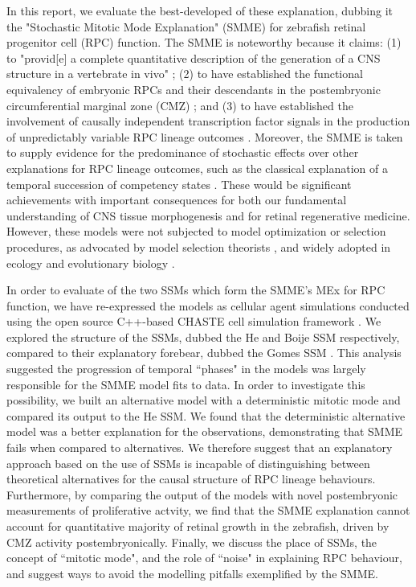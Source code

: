 In this report, we evaluate the best-developed of these explanation, dubbing it the "Stochastic Mitotic Mode Explanation" (SMME) for zebrafish retinal progenitor cell (RPC) function. The SMME is noteworthy because it claims: (1) to "provid[e] a complete quantitative description of the generation of a CNS structure in a vertebrate in vivo" \cite{He2012}; (2) to have established the functional equivalency of embryonic RPCs and their descendants in the postembryonic circumferential marginal zone (CMZ) \cite{Wan2016}; and (3) to have established the involvement of causally independent transcription factor signals in the production of unpredictably variable RPC lineage outcomes \cite{Boije2015}. Moreover, the SMME is taken to supply evidence for the predominance of stochastic effects over other explanations for RPC lineage outcomes, such as the classical explanation of a temporal succession of competency states \cite{Temple1986}. These would be significant achievements with important consequences for both our fundamental understanding of CNS tissue morphogenesis and for retinal regenerative medicine. However, these models were not subjected to model optimization or selection procedures, as advocated by model selection theorists \cite{Burnham2002}, and widely adopted in ecology and evolutionary biology \cite{Johnson2004}.

In order to evaluate of the two SSMs which form the SMME's MEx for RPC function, we have re-expressed the models as cellular agent simulations conducted using the open source C++-based CHASTE cell simulation framework \cite{Mirams2013}. We explored the structure of the SSMs, dubbed the He and Boije SSM respectively, compared to their explanatory forebear, dubbed the Gomes SSM \cite{Gomes2011}. This analysis suggested the progression of temporal ``phases" in the models was largely responsible for the SMME model fits to data. In order to investigate this possibility, we built an alternative model with a deterministic mitotic mode and compared its output to the He SSM. We found that the deterministic alternative model was a better explanation for the observations, demonstrating that SMME fails when compared to alternatives. We therefore suggest that an explanatory approach based on the use of SSMs is incapable of distinguishing between theoretical alternatives for the causal structure of RPC lineage behaviours. Furthermore, by comparing the output of the models with novel postembryonic measurements of proliferative actvity, we find that the SMME explanation cannot account for quantitative majority of retinal growth in the zebrafish, driven by CMZ activity postembryonically. Finally, we discuss the place of SSMs, the concept of ``mitotic mode", and the role of ``noise" in explaining RPC behaviour, and suggest ways to avoid the modelling pitfalls exemplified by the SMME.

